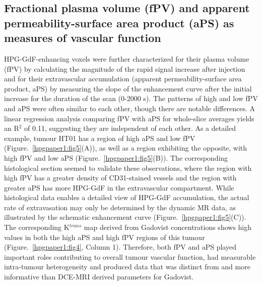 \subsection{Fractional plasma volume (\acs{fPV}) and apparent permeability-surface area product (\acs{aPS}) as measures of vascular function}

\acs{HPG-GdF}-enhancing voxels were further characterized for their plasma volume (\acs{fPV}) by calculating the magnitude of the rapid signal increase after injection and for their extravascular accumulation (apparent permeability-surface area product, \acs{aPS}) by measuring the slope of the enhancement curve after the initial increase for the duration of the scan (0-2000 s).
The patterns of high and low \acs{fPV} and \acs{aPS} were often similar to each other, though there are notable differences.
A linear regression analysis comparing \acs{fPV} with \acs{aPS} for whole-slice averages yields an R$^2$ of 0.11, suggesting they are independent of each other.
As a detailed example, tumour HT01 has a region of high \acs{aPS} and low \acs{fPV} (Figure.~\ref{hpgpaper1:fig5}(A)), as well as a region exhibiting the opposite, with high \acs{fPV} and low \acs{aPS} (Figure.~\ref{hpgpaper1:fig5}(B)).
The corresponding histological section seemed to validate these observations, where the region with high \acs{fPV} has a greater density of \acs{CD31}-stained vessels and the region with greater \acs{aPS} has more \acs{HPG-GdF} in the extravascular compartment.
While histological data enables a detailed view of \acs{HPG-GdF} accumulation, the actual rate of extravasation may only be determined by the dynamic MR data, as illustrated by the schematic enhancement curve (Figure.~\ref{hpgpaper1:fig5}(C)).
The corresponding K$^{trans}$ map derived from Gadovist concentrations shows high values in both the high \acs{aPS} and high \acs{fPV} regions of this tumour (Figure.~\ref{hpgpaper1:fig4}, Column 1).
Therefore, both \acs{fPV} and \acs{aPS} played important roles contributing to overall tumour vascular function, had measurable intra-tumour heterogeneity and produced data that was distinct from and more informative than \acs{DCE-MRI} derived parameters for Gadovist.

